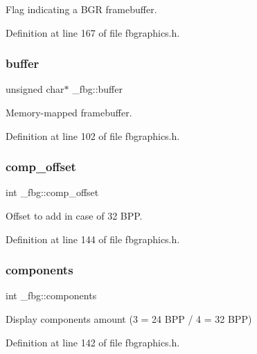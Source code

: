 Flag indicating a B\+GR framebuffer. 



Definition at line 167 of file fbgraphics.\+h.

\mbox{\label{struct__fbg_abd19f36337c99f866e03eb88f6c2a9d5}} 
\subsubsection{\texorpdfstring{buffer}{buffer}}
{\footnotesize\ttfamily unsigned char$\ast$ \+\_\+fbg\+::buffer}



Memory-\/mapped framebuffer. 



Definition at line 102 of file fbgraphics.\+h.

\mbox{\label{struct__fbg_a7c2e64d2f40575c8a989c759c30acb0e}} 
\subsubsection{\texorpdfstring{comp\+\_\+offset}{comp\_offset}}
{\footnotesize\ttfamily int \+\_\+fbg\+::comp\+\_\+offset}



Offset to add in case of 32 B\+PP. 



Definition at line 144 of file fbgraphics.\+h.

\mbox{\label{struct__fbg_a1db77a2ef506723a575644dbc1cfb747}} 
\subsubsection{\texorpdfstring{components}{components}}
{\footnotesize\ttfamily int \+\_\+fbg\+::components}



Display components amount (3 = 24 B\+PP / 4 = 32 B\+PP) 



Definition at line 142 of file fbgraphics.\+h.

